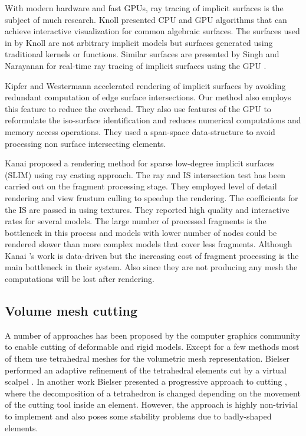 With modern hardware and fast GPUs, ray tracing of implicit surfaces is the subject of much research. Knoll \etal \cite{Knoll2009} presented 
CPU and GPU algorithms that can achieve interactive visualization for common algebraic surfaces. The surfaces used in by Knoll \etal are not 
arbitrary implicit models but surfaces generated using traditional kernels or functions. Similar surfaces are presented by Singh and Narayanan
for real-time ray tracing of implicit surfaces using the GPU \cite{singh2010real}. 


Kipfer and Westermann \cite{Kipfer2005} accelerated rendering of implicit surfaces by avoiding redundant computation of edge surface intersections. 
Our method also employs this feature to reduce the overhead. They also use features of the GPU to reformulate the iso-surface identification and reduces 
numerical computations and memory access operations. They used a span-space data-structure to avoid processing non surface intersecting elements.

Kanai \etal \cite{Kanai2006a} proposed a rendering method for sparse low-degree implicit surfaces (SLIM) using ray casting approach. The ray and IS intersection
test has been carried out on the fragment processing stage. They employed level of detail rendering and view frustum culling to speedup the rendering. 
The coefficients for the IS are passed in using textures. They reported high quality and interactive rates for several models. The large number of processed
fragments is the bottleneck in this process and models with lower number of nodes could be rendered slower than more complex models that cover less fragments.
Although Kanai \etal's work is data-driven but the increasing cost of fragment processing is the main bottleneck in their system. Also since they are not
producing any mesh the computations will be lost after rendering.

\subsection{Volume mesh cutting}
A number of approaches has been proposed by the computer graphics community to enable cutting of deformable and rigid models. 
Except for a few methods most of them use tetrahedral meshes for the volumetric mesh representation. 
Bielser \etal performed an adaptive refinement of the tetrahedral elements cut by a virtual scalpel \cite{Bielser1999}.
In another work Bielser \etal presented a progressive approach to cutting \cite{Bielser2003}, where the decomposition of 
a tetrahedron is changed depending on the movement of the cutting tool inside an element. However, the approach is highly 
non-trivial to implement and also poses some stability problems due to badly-shaped elements.

